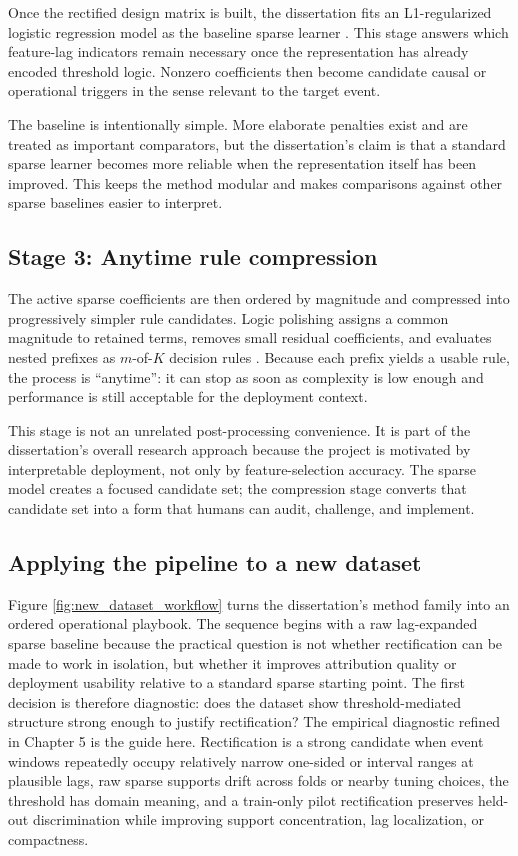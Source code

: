Once the rectified design matrix is built, the dissertation fits an L1-regularized logistic regression model as the baseline sparse learner \autocites{tibshirani1996,fried2010,tay2023}. This stage answers which feature-lag indicators remain necessary once the representation has already encoded threshold logic. Nonzero coefficients then become candidate causal or operational triggers in the sense relevant to the target event.

The baseline is intentionally simple. More elaborate penalties exist and are treated as important comparators, but the dissertation's claim is that a standard sparse learner becomes more reliable when the representation itself has been improved. This keeps the method modular and makes comparisons against other sparse baselines easier to interpret.

\subsection{Stage 3: Anytime rule compression}

The active sparse coefficients are then ordered by magnitude and compressed into progressively simpler rule candidates. Logic polishing assigns a common magnitude to retained terms, removes small residual coefficients, and evaluates nested prefixes as $m$-of-$K$ decision rules \autocite{JOrender2025Anytime}. Because each prefix yields a usable rule, the process is ``anytime'': it can stop as soon as complexity is low enough and performance is still acceptable for the deployment context.

This stage is not an unrelated post-processing convenience. It is part of the dissertation's overall research approach because the project is motivated by interpretable deployment, not only by feature-selection accuracy. The sparse model creates a focused candidate set; the compression stage converts that candidate set into a form that humans can audit, challenge, and implement.

\subsection{Applying the pipeline to a new dataset}

Figure \ref{fig:new_dataset_workflow} turns the dissertation's method family into an ordered operational playbook. The sequence begins with a raw lag-expanded sparse baseline because the practical question is not whether rectification can be made to work in isolation, but whether it improves attribution quality or deployment usability relative to a standard sparse starting point. The first decision is therefore diagnostic: does the dataset show threshold-mediated structure strong enough to justify rectification? The empirical diagnostic refined in Chapter 5 is the guide here. Rectification is a strong candidate when event windows repeatedly occupy relatively narrow one-sided or interval ranges at plausible lags, raw sparse supports drift across folds or nearby tuning choices, the threshold has domain meaning, and a train-only pilot rectification preserves held-out discrimination while improving support concentration, lag localization, or compactness.

